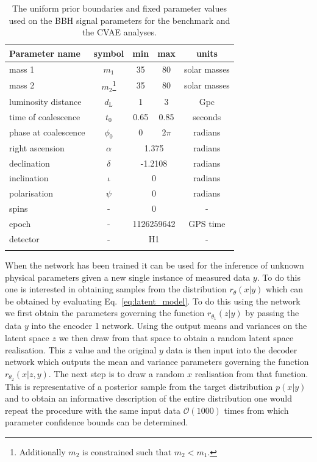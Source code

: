\documentclass[%
showpacs,
 amsmath,amssymb,
 aps,
 twocolumn,
 prl,
 reprint,
floatfix,
]{revtex4-1}
\begin{document}
%
%
\begin{table}
\centering
\caption{The uniform prior boundaries and fixed parameter values used on the \ac{BBH} signal parameters for the benchmark
and the \ac{CVAE} analyses.}
\begin{tabular}[t]{lcccc}
\toprule
Parameter name & symbol & min & max & units \\
\hline
mass 1 & $m_1$ & 35 & 80 & solar masses \\
mass 2 & $m_2$\footnote{Additionally $m_2$ is constrained such that
$m_{2}<m_{1}$.} & 35 & 80 & solar masses \\
luminosity distance & $d_{\text{L}}$ & 1 & 3 & Gpc \\
time of coalescence & $t_{0}$ & 0.65 & 0.85 & seconds \\
phase at coalescence & $\phi_{0}$ & 0 & $2\pi$ & radians \\
\hline
right ascension & $\alpha$ & \multicolumn{2}{c}{1.375} & radians \\
declination & $\delta$ & \multicolumn{2}{c}{-1.2108} & radians \\
inclination & $\iota$ & \multicolumn{2}{c}{0} & radians \\
polarisation & $\psi$ & \multicolumn{2}{c}{0} & radians \\
spins & - & \multicolumn{2}{c}{0} & - \\
epoch & - & \multicolumn{2}{c}{1126259642} & GPS time \\
detector & - & \multicolumn{2}{c}{H1} & - \\
\botrule
\end{tabular}
\label{tab:prior_ranges}
\end{table}

When the network has been trained it can be used for the inference of unknown
physical parameters given a new single instance of measured data $y$. To do
this one is interested in obtaining samples from the distribution
$r_{\theta}(x|y)$ which can be obtained by evaluating
Eq.~\ref{eq:latent_model}. To do this using the network we first obtain the
parameters governing the function $r_{\theta_{1}}(z|y)$ by passing the data $y$
into the encoder 1 network. Using the output means and variances on the latent space
$z$ we then draw from that space to obtain a random latent space realisation.
This $z$ value and the original $y$ data is then input into the decoder network
which outputs the mean and variance parameters governing the function
$r_{\theta_{2}}(x|z,y)$. The next step is to draw a random $x$ realisation from
that function. This is representative of a posterior sample from the target
distribution $p(x|y)$ and to obtain an informative description of the entire
distribution one would repeat the procedure with the same input data
$\mathcal{O}(1000)$ times from which parameter confidence bounds can be
determined.      
\end{document}
